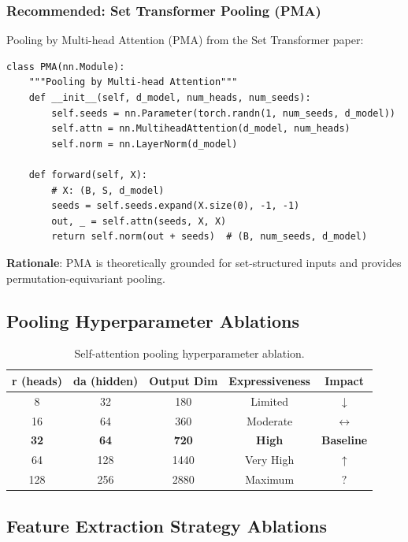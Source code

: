 \documentclass[11pt,a4paper]{article}
\begin{document}
\subsubsection{Recommended: Set Transformer Pooling (PMA)}

Pooling by Multi-head Attention (PMA) from the Set Transformer paper:

\begin{verbatim}
class PMA(nn.Module):
    """Pooling by Multi-head Attention"""
    def __init__(self, d_model, num_heads, num_seeds):
        self.seeds = nn.Parameter(torch.randn(1, num_seeds, d_model))
        self.attn = nn.MultiheadAttention(d_model, num_heads)
        self.norm = nn.LayerNorm(d_model)
    
    def forward(self, X):
        # X: (B, S, d_model)
        seeds = self.seeds.expand(X.size(0), -1, -1)
        out, _ = self.attn(seeds, X, X)
        return self.norm(out + seeds)  # (B, num_seeds, d_model)
\end{verbatim}

\textbf{Rationale}: PMA is theoretically grounded for set-structured inputs and provides permutation-equivariant pooling.

\subsection{Pooling Hyperparameter Ablations}

\begin{table}[H]
\centering
\begin{tabular}{ccccc}
\toprule
\textbf{r (heads)} & \textbf{da (hidden)} & \textbf{Output Dim} & \textbf{Expressiveness} & \textbf{Impact} \\
\midrule
8 & 32 & 180 & Limited & \textcolor{negative}{$\downarrow$} \\
16 & 64 & 360 & Moderate & \textcolor{neutral}{$\leftrightarrow$} \\
\rowcolor{lightgray}
\textbf{32} & \textbf{64} & \textbf{720} & \textbf{High} & \textbf{Baseline} \\
64 & 128 & 1440 & Very High & \textcolor{positive}{$\uparrow$} \\
128 & 256 & 2880 & Maximum & \textcolor{uncertain}{$?$} \\
\bottomrule
\end{tabular}
\caption{Self-attention pooling hyperparameter ablation.}
\end{table}

\subsection{Feature Extraction Strategy Ablations}
\end{document}
